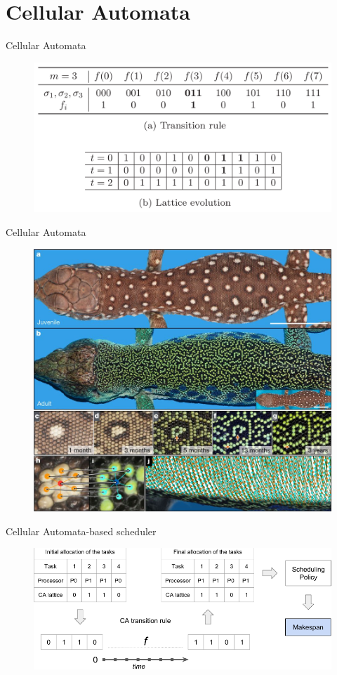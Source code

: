 \documentclass{beamer}
\begin{document}
\section{Cellular Automata}
\begin{frame}{Cellular Automata}
\begin{figure}
\includegraphics[width=\textwidth]{ca1.png}
\end{figure}
\end{frame}

\begin{frame}{Cellular Automata}
\begin{figure}
\includegraphics[width=.9\textwidth]{natural_phenomena}
\end{figure}
\end{frame}

\begin{frame}{Cellular Automata-based scheduler}
\begin{figure}
\includegraphics[width=\textwidth]{ca2.png}
\end{figure}
\end{frame}
\end{document}
